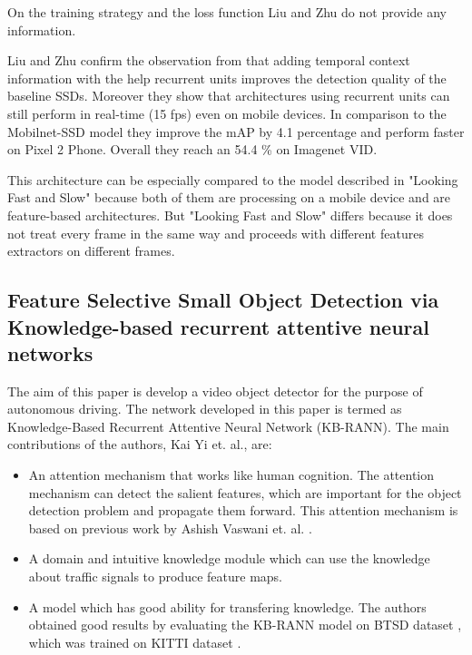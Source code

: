 \documentclass[conference]{IEEEtran}
\begin{document}
On the training strategy and the loss function Liu and Zhu do not provide any information. \newline

Liu and Zhu confirm the observation from \cite{b1} that adding temporal context information with the help recurrent units improves the detection quality of the baseline SSDs. Moreover they show that architectures using recurrent units can still perform in real-time (15 fps) even on mobile devices. In comparison to the Mobilnet-SSD model they improve the mAP by 4.1 percentage and perform faster on Pixel 2 Phone. Overall they reach an 54.4 \% on Imagenet VID. \newline

This architecture can be especially compared to the model described in "Looking Fast and Slow" because both of them are processing on a mobile device and are feature-based architectures. But "Looking Fast and Slow" differs because it does not treat every frame in the same way and proceeds with different features extractors on different frames. 

\subsection{Feature Selective Small Object Detection via Knowledge-based recurrent attentive neural networks \cite{b6}}

The aim of this paper is develop a video object detector for the purpose of autonomous driving. The network developed in this paper is termed as Knowledge-Based Recurrent Attentive Neural Network (KB-RANN). \newline
The main contributions of the authors, Kai Yi et. al., are:
\begin{itemize}
  \item An attention mechanism that works like human cognition. The attention mechanism can detect the salient features, which are important for the object detection problem and propagate them forward. This attention mechanism is based on previous work by Ashish Vaswani et. al. \cite{b30}. 
  \item A domain and intuitive knowledge module which can use the knowledge about traffic signals to produce feature maps.
  \item A model which has good ability for transfering knowledge. The authors obtained good results by evaluating the KB-RANN model on BTSD dataset \cite{b29}, which was trained on KITTI dataset \cite{b21}.
\end{itemize}
\end{document}
